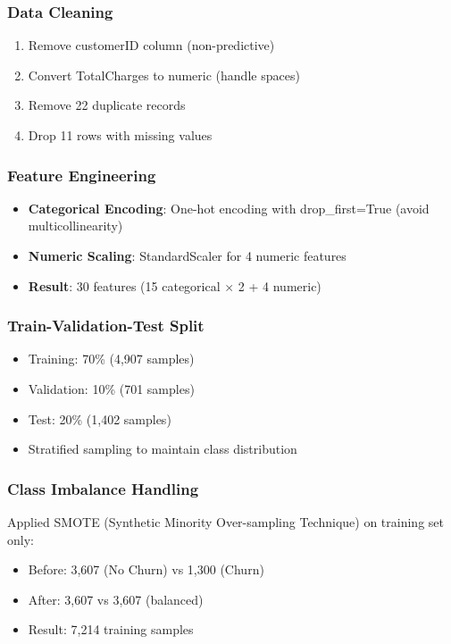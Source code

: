 \documentclass[11pt,a4paper]{article}
\begin{document}
\subsubsection{Data Cleaning}
\begin{enumerate}
    \item Remove customerID column (non-predictive)
    \item Convert TotalCharges to numeric (handle spaces)
    \item Remove 22 duplicate records
    \item Drop 11 rows with missing values
\end{enumerate}

\subsubsection{Feature Engineering}
\begin{itemize}
    \item \textbf{Categorical Encoding}: One-hot encoding with drop\_first=True (avoid multicollinearity)
    \item \textbf{Numeric Scaling}: StandardScaler for 4 numeric features
    \item \textbf{Result}: 30 features (15 categorical $\times$ 2 + 4 numeric)
\end{itemize}

\subsubsection{Train-Validation-Test Split}
\begin{itemize}
    \item Training: 70\% (4,907 samples)
    \item Validation: 10\% (701 samples)
    \item Test: 20\% (1,402 samples)
    \item Stratified sampling to maintain class distribution
\end{itemize}

\subsubsection{Class Imbalance Handling}
Applied SMOTE (Synthetic Minority Over-sampling Technique) on training set only:
\begin{itemize}
    \item Before: 3,607 (No Churn) vs 1,300 (Churn)
    \item After: 3,607 vs 3,607 (balanced)
    \item Result: 7,214 training samples
\end{itemize}
\end{document}
